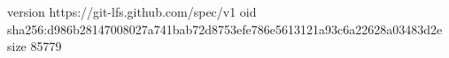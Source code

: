 version https://git-lfs.github.com/spec/v1
oid sha256:d986b28147008027a741bab72d8753efe786e5613121a93c6a22628a03483d2e
size 85779
